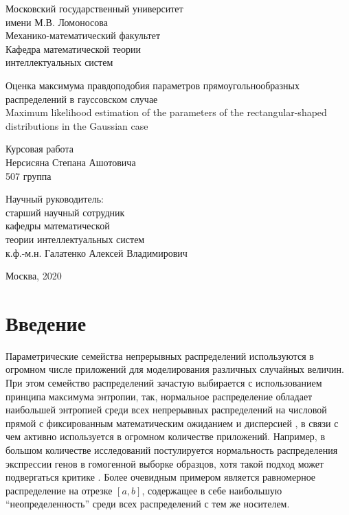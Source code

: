 \documentclass[12pt]{article}
\theoremstyle{definition}
\theoremstyle{plain}
\begin{document}
\thispagestyle{empty}
\begin{center}
\Large Московский государственный университет \\ имени М.В. Ломоносова \\
\Large Механико-математический факультет \\
\Large Кафедра математической теории \\ интеллектуальных систем

\vspace{100pt}

\Large Оценка максимума правдоподобия параметров прямоугольнообразных распределений 
в гауссовском случае \\
\Large Maximum likelihood estimation of the parameters of the 
rectangular-shaped distributions in the Gaussian case

\vspace{20pt}

\Large Курсовая работа \\ Нерсисяна Степана Ашотовича \\ 507 группа
\end{center}

\vspace{50pt}
\begin {flushright}
\Large Научный руководитель: \\
\Large старший научный сотрудник \\ кафедры математической \\ теории интеллектуальных систем \\
\Large к.ф.-м.н. Галатенко Алексей Владимирович
\end {flushright}

\vspace{120pt}

\begin{center}
\Large Москва, 2020
\end{center}

\newpage

\section{Введение}
Параметрические семейства непрерывных распределений используются
в огромном числе приложений для моделирования различных случайных 
величин. При этом семейство распределений зачастую выбирается с
использованием принципа максимума энтропии, так, нормальное распределение
обладает наибольшей энтропией среди всех непрерывных распределений 
на числовой прямой с фиксированным математическим ожиданием и дисперсией \cite{Murphy2013},
в связи с чем активно используется в огромном количестве приложений. Например,
в большом количестве исследований постулируется нормальность распределения
экспрессии генов в гомогенной выборке образцов, хотя такой подход может
подвергаться критике \cite{Hebenstreit2011}. Более очевидным примером является равномерное 
распределение на отрезке $[a, b]$, содержащее в себе наибольшую 
``неопределенность'' среди всех распределений с тем же носителем.
\end{document}
